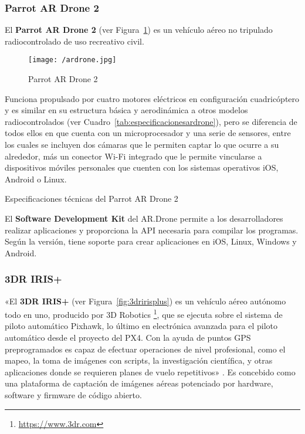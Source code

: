 \subsubsection{Parrot AR Drone 2}
\label{sec:ARDrone}

El \textbf{Parrot AR Drone 2} (ver Figura~\ref{fig:ardrone}) es un vehículo aéreo no tripulado radiocontrolado de uso recreativo civil.

\begin{figure}[!h]
\begin{center}
\texttt{[image: /ardrone.jpg]}
\caption[Parrot AR Drone 2]{Parrot AR Drone 2}
\label{fig:ardrone}
\end{center}
\end{figure} 

Funciona propulsado por cuatro motores eléctricos en configuración cuadricóptero y es similar en su estructura básica y aerodinámica a otros modelos radiocontrolados (ver Cuadro~\ref{tab:especificacionesardrone}), pero se diferencia de todos ellos en que cuenta con un microprocesador y una serie de sensores, entre los cuales se incluyen dos cámaras que le permiten captar lo que ocurre a su alrededor, más un conector Wi-Fi integrado que le permite vincularse a dispositivos móviles personales que cuenten con los sistemas operativos iOS, Android o Linux.

\begin{table}[!h]
 \centering
 {\small
 
 }
 \caption[Especificaciones técnicas del Parrot AR Drone 2]
 {Especificaciones técnicas del Parrot AR Drone 2 \footnotemark}
 \label{tab:especificacionesardrone}
\end{table}


El \textbf{Software Development Kit} del AR.Drone permite a los desarrolladores realizar aplicaciones y proporciona la \acs{API} necesaria para compilar los programas. Según la versión, tiene soporte para crear aplicaciones en iOS, Linux, Windows y Android.

\subsubsection{3DR IRIS+}
\label{sec:3driris}
«El \textbf{3DR IRIS+} (ver Figura~\ref{fig:3dririsplus}) es un vehículo aéreo autónomo todo en uno, producido por 3D Robotics \footnote{\url{https://www.3dr.com}}, que se ejecuta sobre el sistema de piloto automático Pixhawk, lo último en electrónica avanzada para el piloto automático desde el proyecto del PX4. Con la ayuda de puntos \acs{GPS} preprogramados es capaz de efectuar operaciones de nivel profesional, como el mapeo, la toma de imágenes con scripts, la investigación científica, y otras aplicaciones donde se requieren planes de vuelo repetitivos» \cite{3driris}. Es concebido como una plataforma de captación de imágenes aéreas potenciado por hardware, software y firmware de código abierto.

